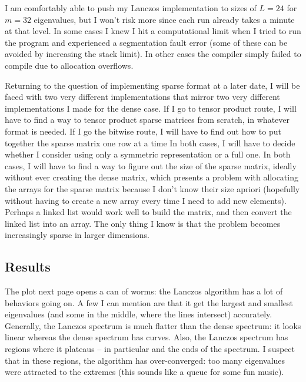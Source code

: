 \documentclass{article}
\begin{document}
I am comfortably able to push my Lanczos implementation to sizes of $L = 24$
for $m = 32$ eigenvalues, but I won't risk more since each run already takes
a minute at that level.
In some cases I knew I hit a computational limit when I tried to run the program
and experienced a segmentation fault error 
(some of these can be avoided by increasing the stack limit).
In other cases the compiler simply failed to compile due to allocation overflows.

Returning to the question of implementing sparse format at a later date,
I will be faced with two very different implementations that mirror
two very different implementations I made for the dense case.
If I go to tensor product route, I will have to find a way to tensor
product sparse matrices from scratch, in whatever format is needed.
If I go the bitwise route, I will have to find out how to put together
the sparse matrix one row at a time
In both cases, I will have to decide whether I consider using only a
symmetric representation or a full one.
In both cases, I will have to find a way to figure out the size of the
sparse matrix, ideally without ever creating the dense matrix, which
presents a problem with allocating the arrays for the sparse matrix
because I don't know their size apriori (hopefully without having to create 
a new array every time I need to add new elements).
Perhaps a linked list would work well to build the matrix, and then 
convert the linked list into an array.
The only thing I know is that the problem becomes
increasingly sparse in larger dimensions. 

\subsection{
Results
}

The plot next page opens a can of worms: the Lanczos algorithm has
a lot of behaviors going on.
A few I can mention are that it get the largest and smallest
eigenvalues (and some in the middle, where the lines intersect)
accurately.
Generally, the Lanczos spectrum is much flatter than the dense spectrum:
it looks linear whereas the dense spectrum has curves.
Also, the Lanczos spectrum has regions where it plateaus -- in particular
and the ends of the spectrum.
I suspect that in these regions, the algorithm has over-converged: too
many eigenvalues were attracted to the extremes
(this sounds like a queue for some fun music).

{\centering



}
\end{document}
